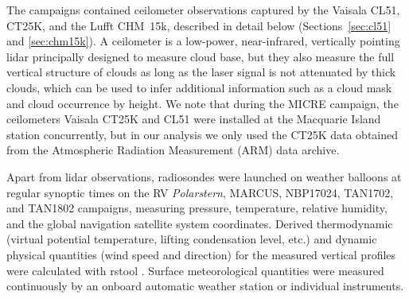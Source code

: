 \documentclass[draft]{agujournal2019}
\begin{document}
The campaigns contained ceilometer observations captured by the Vaisala CL51, CT25K, and the Lufft CHM~15k, described in detail below (Sections~\ref{sec:cl51} and \ref{sec:chm15k}). A ceilometer is a low-power, near-infrared, vertically pointing lidar principally designed to measure cloud base, but they also measure the full vertical structure of clouds as long as the laser signal is not attenuated by thick clouds, which can be used to infer additional information such as a cloud mask and cloud occurrence by height. We note that during the MICRE campaign, the ceilometers Vaisala CT25K and CL51 were installed at the Macquarie Island station concurrently, but in our analysis we only used the CT25K data obtained from the Atmospheric Radiation Measurement (ARM) data archive.

Apart from lidar observations, radiosondes were launched on weather balloons at regular synoptic times on the RV \emph{Polarstern}, MARCUS, NBP17024, TAN1702, and TAN1802 campaigns, measuring pressure, temperature, relative humidity, and the global navigation satellite system coordinates. Derived thermodynamic (virtual potential temperature, lifting condensation level, etc.) and dynamic physical quantities (wind speed and direction) for the measured vertical profiles were calculated with rstool \cite{rstool}. Surface meteorological quantities were measured continuously by an onboard automatic weather station or individual instruments.
\end{document}
